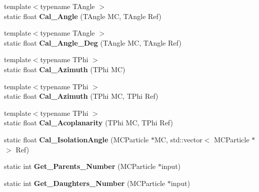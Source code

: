 \begin{DoxyCompactItemize}
\item 
\hypertarget{classToolSet_1_1CMC_a0637a061bf4ecd9084b794023cc11816}{
{\footnotesize template$<$typename TAngle $>$ }\\static float {\bfseries Cal\_\-Angle} (TAngle MC, TAngle Ref)}
\label{classToolSet_1_1CMC_a0637a061bf4ecd9084b794023cc11816}

\item 
\hypertarget{classToolSet_1_1CMC_a58389b8e6c06afb39377d6d078e5616f}{
{\footnotesize template$<$typename TAngle $>$ }\\static float {\bfseries Cal\_\-Angle\_\-Deg} (TAngle MC, TAngle Ref)}
\label{classToolSet_1_1CMC_a58389b8e6c06afb39377d6d078e5616f}

\item 
\hypertarget{classToolSet_1_1CMC_a3c8cfd47eac44d6e39a38598bb9158f1}{
{\footnotesize template$<$typename TPhi $>$ }\\static float {\bfseries Cal\_\-Azimuth} (TPhi MC)}
\label{classToolSet_1_1CMC_a3c8cfd47eac44d6e39a38598bb9158f1}

\item 
\hypertarget{classToolSet_1_1CMC_ab77fa5dd46a12ac8887776724261f72b}{
{\footnotesize template$<$typename TPhi $>$ }\\static float {\bfseries Cal\_\-Azimuth} (TPhi MC, TPhi Ref)}
\label{classToolSet_1_1CMC_ab77fa5dd46a12ac8887776724261f72b}

\item 
\hypertarget{classToolSet_1_1CMC_aa1667ca515e4b26ca43755fd8d2e30bd}{
{\footnotesize template$<$typename TPhi $>$ }\\static float {\bfseries Cal\_\-Acoplanarity} (TPhi MC, TPhi Ref)}
\label{classToolSet_1_1CMC_aa1667ca515e4b26ca43755fd8d2e30bd}

\item 
\hypertarget{classToolSet_1_1CMC_add27d6c12067e096d96d45af53d5c6aa}{
static float {\bfseries Cal\_\-IsolationAngle} (MCParticle $\ast$MC, std::vector$<$ MCParticle $\ast$ $>$ Ref)}
\label{classToolSet_1_1CMC_add27d6c12067e096d96d45af53d5c6aa}

\item 
\hypertarget{classToolSet_1_1CMC_a67ab1d51b7fd0f98cfa19be5381e961a}{
static int {\bfseries Get\_\-Parents\_\-Number} (MCParticle $\ast$input)}
\label{classToolSet_1_1CMC_a67ab1d51b7fd0f98cfa19be5381e961a}

\item 
\hypertarget{classToolSet_1_1CMC_a44a3b5e5df7effa4ed170151cd63b706}{
static int {\bfseries Get\_\-Daughters\_\-Number} (MCParticle $\ast$input)}
\label{classToolSet_1_1CMC_a44a3b5e5df7effa4ed170151cd63b706}


\end{DoxyCompactItemize}

